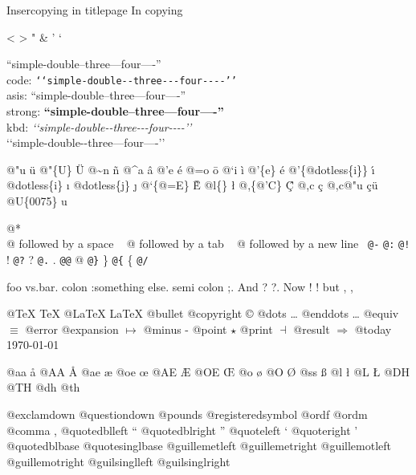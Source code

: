 \documentclass{book}
\begin{document}
\begin{titlepage}
Insercopying in titlepage
In copying

<
>
"
\&
'
`

``simple-double--three---four----''\leavevmode{}\\
code: \texttt{{`}{`}simple-double{-}{-}three{-}{-}{-}four{-}{-}{-}-{'}{'}} \leavevmode{}\\
asis: ``simple-double--three---four----'' \leavevmode{}\\
strong: \textbf{``simple-double--three---four----''} \leavevmode{}\\
kbd: {\ttfamily\textsl{{`}{`}simple-double{-}{-}three{-}{-}{-}four{-}{-}{-}-{'}{'}}} \leavevmode{}\\

`\hbox{}`simple-double-\hbox{}-three---four----'\hbox{}'\leavevmode{}\\

%
%
%
%

@"u \"{u} 
@"\{U\} \"{U} 
@\~{}n \~{n}
@\^{}a \^{a}
@'e \'{e}
@=o \={o}
@`i \`{i}
@'\{e\} \'{e}
@'\{@dotless\{i\}\} \'{\i{}} 
@dotless\{i\} \i{}
@dotless\{j\} \j{}
@`\{@=E\} \`{\={E}} 
@l\{\} \l{}
@,\{@'C\} \c{\'{C}}
@,c \c{c}
@,c@"u \c{c}\"{u} \leavevmode{}\\

@U\{0075\} u

@* \leavevmode{}\\
@ followed by a space
\ {}
@ followed by a tab
\ {}
@ followed by a new line
\ {}\texttt{@-} \-{}
\texttt{@:} \@
\texttt{@!} \@!
\texttt{@?} \@?
\texttt{@.} \@.
\texttt{@@} @
\texttt{@\}} \}
\texttt{@\{} \{
\texttt{@/} 

foo vs.\@ bar. 
colon :\@And something else.
semi colon ;\@.
And ? ?\@.
Now ! !\@@
but , ,\@

@TeX \TeX{}
@LaTeX \LaTeX{}
@bullet \textbullet{}
@copyright \copyright{}
@dots \dots{}\@
@enddots \dots{}
@equiv $\equiv{}$
@error 
@expansion $\mapsto{}$
@minus -
@point $\star{}$
@print $\dashv{}$
@result $\Rightarrow{}$
@today \today{}

@aa \aa{}
@AA \AA{}
@ae \ae{}
@oe \oe{}
@AE \AE{}
@OE \OE{}
@o \o{}
@O \O{}
@ss \ss{}
@l \l{}
@L \L{}
@DH \DH{}
@TH \TH{}
@dh \dh{}
@th \th{}

@exclamdown \textexclamdown{}
@questiondown \textquestiondown{}
@pounds \textsterling{}
@registeredsymbol \circledR{}
@ordf \textordfeminine{}
@ordm \textordmasculine{}
@comma ,
@quotedblleft \textquotedblleft{}
@quotedblright \textquotedblright{}
@quoteleft \textquoteleft{}
@quoteright \textquoteright{}
@quotedblbase \quotedblbase{}
@quotesinglbase \quotesinglbase{}
@guillemetleft \guillemotleft{}
@guillemetright \guillemotright{}
@guillemotleft \guillemotleft{}
@guillemotright \guillemotright{}
@guilsinglleft \guilsinglleft{}
@guilsinglright \guilsinglright{}


\end{titlepage}
\end{document}
